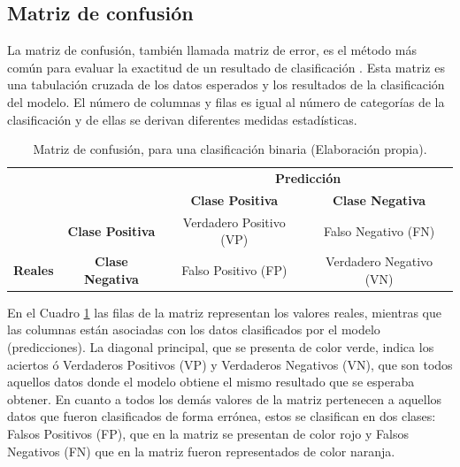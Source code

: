 \subsection{Matriz de confusi\'{o}n}

La matriz de confusi\'{o}n, tambi\'{e}n llamada matriz de error, es el m\'{e}todo m\'{a}s com\'{u}n para evaluar la exactitud de un resultado de clasificaci\'{o}n \cite{Reference61}. Esta matriz es una tabulaci\'{o}n cruzada de los datos esperados y los resultados de la clasificaci\'{o}n del modelo. El n\'{u}mero de columnas y filas es igual al n\'{u}mero de categor\'{i}as de la clasificaci\'{o}n y de ellas se derivan diferentes medidas estad\'{i}sticas.

\begin{table}[H]

\centering
\begin{center}
\begin{tabular}{ll|c|c|}
\cline{3-4}
                                                        &                                              & \multicolumn{2}{c|}{\textbf{Predicci\'{o}n}}                                                          \\ \cline{3-4} 
                                                        &                                              & \textbf{Clase Positiva}                         & \textbf{Clase Negativa}                         \\ \hline
\multicolumn{1}{|c|}{}                                  & \multicolumn{1}{c|}{\textbf{Clase Positiva}} & \cellcolor[HTML]{AADD99}Verdadero Positivo (VP) & \cellcolor[HTML]{FFCE93}Falso Negativo (FN)     \\ \cline{2-4} 
\multicolumn{1}{|c|}{\multirow{-2}{*}{\textbf{Reales}}} & \multicolumn{1}{c|}{\textbf{Clase Negativa}} & \cellcolor[HTML]{DF9F9F}Falso Positivo (FP)     & \cellcolor[HTML]{AADD99}Verdadero Negativo (VN) \\ \hline
\end{tabular}
\caption{Matriz de confusi\'{o}n, para una clasificaci\'{o}n binaria (Elaboraci\'{o}n propia).}
\label{table:matriz}
\end{center}
\end{table}

\vspace{5mm} %

En el Cuadro \ref{table:matriz} las filas de la matriz representan los valores reales, mientras que las columnas est\'{a}n asociadas con los datos clasificados por el modelo (predicciones). La diagonal principal, que se presenta de color verde, indica los aciertos \'{o} Verdaderos Positivos (VP) y Verdaderos Negativos (VN), que son todos aquellos datos donde el modelo obtiene el mismo resultado que se esperaba obtener. En cuanto a todos los dem\'{a}s valores de la matriz pertenecen a aquellos datos que fueron clasificados de forma err\'{o}nea, estos se clasifican en dos clases: Falsos Positivos (FP), que en la matriz se presentan de color rojo y Falsos Negativos (FN) que en la matriz fueron representados de color naranja.

